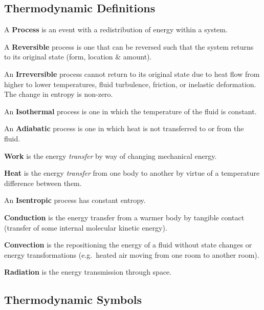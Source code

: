 \documentclass[
]{book}
\begin{document}
\hypertarget{thermodynamic-definitions}{%
\subsection{Thermodynamic Definitions}\label{thermodynamic-definitions}}

A \textbf{Process} is an event with a redistribution of energy within a system.

A \textbf{Reversible} process is one that can be reversed such that the system returns to its original state (form, location \& amount).

An \textbf{Irreversible} process cannot return to its original state due to heat flow from higher to lower temperatures, fluid turbulence, friction, or inelastic deformation. The change in entropy is non-zero.

An \textbf{Isothermal} process is one in which the temperature of the fluid is constant.

An \textbf{Adiabatic} process is one in which heat is not transferred to or from the fluid.

\textbf{Work} is the energy \emph{transfer} by way of changing mechanical energy.

\textbf{Heat} is the energy \emph{transfer} from one body to another by virtue of a temperature difference between them.

An \textbf{Isentropic} process has constant entropy.

\textbf{Conduction} is the energy transfer from a warmer body by tangible contact (transfer of some internal molecular kinetic energy).

\textbf{Convection} is the repositioning the energy of a fluid without state changes or energy transformations (e.g.~heated air moving from one room to another room).

\textbf{Radiation} is the energy transmission through space.

\hypertarget{thermodynamic-symbols}{%
\subsection{Thermodynamic Symbols}\label{thermodynamic-symbols}}
\end{document}
